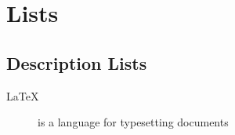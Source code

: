 \documentclass[book.tex]{subfiles}
\begin{document}
\chapter{Lists}
\section{Description Lists}

\begin{description}
  \item[\LaTeX] is a language for typesetting documents
\end{description}
\end{document}
